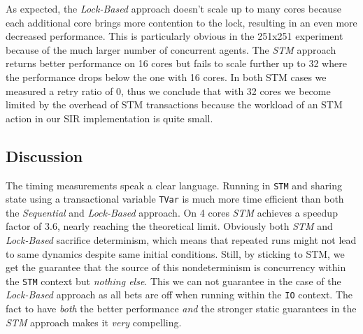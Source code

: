 As expected, the \textit{Lock-Based} approach doesn't scale up to many cores because each additional core brings more contention to the lock, resulting in an even more decreased performance. This is particularly obvious in the 251x251 experiment because of the much larger number of concurrent agents. The \textit{STM} approach returns better performance on 16 cores but fails to scale further up to 32 where the performance drops below the one with 16 cores. In both STM cases we measured a retry ratio of 0, thus we conclude that with 32 cores we become limited by the overhead of STM transactions \cite{perfumo_limits_2008} because the workload of an STM action in our SIR implementation is quite small.

%

\subsection{Discussion}
The timing measurements speak a clear language. Running in \texttt{STM} and sharing state using a transactional variable \texttt{TVar} is much more time efficient than both the \textit{Sequential} and \textit{Lock-Based} approach. On 4 cores \textit{STM} achieves a speedup factor of 3.6, nearly reaching the theoretical limit.
Obviously both \textit{STM} and \textit{Lock-Based} sacrifice determinism, which means that repeated runs might not lead to same dynamics despite same initial conditions. Still, by sticking to STM, we get the guarantee that the source of this nondeterminism is concurrency within the \texttt{STM} context but \textit{nothing else}. This we can not guarantee in the case of the \textit{Lock-Based} approach as all bets are off when running within the \texttt{IO} context. The fact to have \textit{both} the better performance \textit{and} the stronger static guarantees in the \textit{STM} approach makes it \textit{very} compelling.